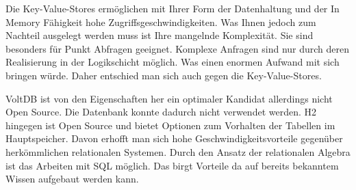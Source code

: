 Die Key-Value-Stores ermöglichen mit Ihrer Form der Datenhaltung und der In Memory Fähigkeit hohe Zugriffsgeschwindigkeiten. Was Ihnen jedoch zum Nachteil ausgelegt werden muss ist Ihre mangelnde Komplexität. Sie sind besonders für Punkt Abfragen geeignet. Komplexe Anfragen sind nur durch deren Realisierung in der Logikschicht möglich. Was einen enormen Aufwand mit sich bringen würde. Daher entschied man sich auch gegen die Key-Value-Stores. 

VoltDB ist von den Eigenschaften her ein optimaler Kandidat allerdings nicht Open Source. Die Datenbank konnte dadurch nicht verwendet werden. H2 hingegen ist Open Source und bietet Optionen zum Vorhalten der Tabellen im Hauptspeicher. Davon erhofft man sich hohe Geschwindigkeitsvorteile gegenüber herkömmlichen relationalen Systemen. Durch den Ansatz der relationalen Algebra ist das Arbeiten mit SQL möglich. Das birgt Vorteile da auf bereits bekanntem Wissen aufgebaut werden kann.